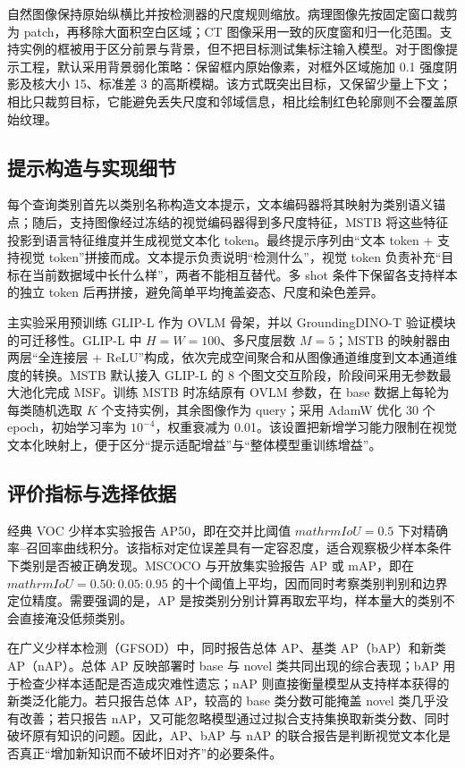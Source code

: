 自然图像保持原始纵横比并按检测器的尺度规则缩放。病理图像先按固定窗口裁剪为 patch，再移除大面积空白区域；CT 图像采用一致的灰度窗和归一化范围。支持实例的框被用于区分前景与背景，但不把目标测试集标注输入模型。对于图像提示工程，默认采用背景弱化策略：保留框内原始像素，对框外区域施加 0.1 强度阴影及核大小 15、标准差 3 的高斯模糊。该方式既突出目标，又保留少量上下文；相比只裁剪目标，它能避免丢失尺度和邻域信息，相比绘制红色轮廓则不会覆盖原始纹理。

\subsection{提示构造与实现细节}
每个查询类别首先以类别名称构造文本提示，文本编码器将其映射为类别语义锚点；随后，支持图像经过冻结的视觉编码器得到多尺度特征，MSTB 将这些特征投影到语言特征维度并生成视觉文本化 token。最终提示序列由“文本 token + 支持视觉 token”拼接而成。文本提示负责说明“检测什么”，视觉 token 负责补充“目标在当前数据域中长什么样”，两者不能相互替代。多 shot 条件下保留各支持样本的独立 token 后再拼接，避免简单平均掩盖姿态、尺度和染色差异。

主实验采用预训练 GLIP-L 作为 OVLM 骨架，并以 GroundingDINO-T 验证模块的可迁移性。GLIP-L 中 $H=W=100$、多尺度层数 $M=5$；MSTB 的映射器由两层“全连接层 + ReLU”构成，依次完成空间聚合和从图像通道维度到文本通道维度的转换。MSTB 默认接入 GLIP-L 的 8 个图文交互阶段，阶段间采用无参数最大池化完成 MSF。训练 MSTB 时冻结原有 OVLM 参数，在 base 数据上每轮为每类随机选取 $K$ 个支持实例，其余图像作为 query；采用 AdamW 优化 30 个 epoch，初始学习率为 $10^{-4}$，权重衰减为 0.01。该设置把新增学习能力限制在视觉文本化映射上，便于区分“提示适配增益”与“整体模型重训练增益”。

\subsection{评价指标与选择依据}
经典 VOC 少样本实验报告 AP50，即在交并比阈值 $mathrm{IoU}=0.5$ 下对精确率--召回率曲线积分。该指标对定位误差具有一定容忍度，适合观察极少样本条件下类别是否被正确发现。MSCOCO 与开放集实验报告 AP 或 mAP，即在 $mathrm{IoU}=0.50:0.05:0.95$ 的十个阈值上平均，因而同时考察类别判别和边界定位精度\cite{lin2014microsoftCOCO}。需要强调的是，AP 是按类别分别计算再取宏平均，样本量大的类别不会直接淹没低频类别。

在广义少样本检测（GFSOD）中，同时报告总体 AP、基类 AP（bAP）和新类 AP（nAP）。总体 AP 反映部署时 base 与 novel 类共同出现的综合表现；bAP 用于检查少样本适配是否造成灾难性遗忘；nAP 则直接衡量模型从支持样本获得的新类泛化能力。若只报告总体 AP，较高的 base 类分数可能掩盖 novel 类几乎没有改善；若只报告 nAP，又可能忽略模型通过过拟合支持集换取新类分数、同时破坏原有知识的问题。因此，AP、bAP 与 nAP 的联合报告是判断视觉文本化是否真正“增加新知识而不破坏旧对齐”的必要条件\cite{wang2020frustratingly,zhang2022metaDETR1}。

